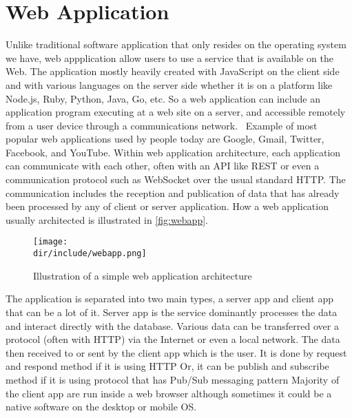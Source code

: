 \section{Web Application}
\label{sec:webapp}

Unlike traditional software application that only resides on the operating system we have, web appplication allow users to use a service that is available on the Web.
The application mostly heavily created with JavaScript on the client side and with various languages on the server side whether it is on a platform like Node.js, Ruby, Python, Java, Go, etc.
So a web application can include an application program executing at a web site on a server, and accessible remotely from a user device through a communications network.~\autocite{Addala:2013:InteractiveWebAppFramework}
Example of most popular web applications used by people today are Google, Gmail, Twitter, Facebook, and YouTube.
Within web application architecture, each application can communicate with each other, often with an \ac{API} like \ac{REST} or even a communication protocol such as WebSocket over the usual standard \ac{HTTP}.
The communication includes the reception and publication of data that has already been processed by any of client or server application.
How a web application usually architected is illustrated in \autoref{fig:webapp}.

\begin{figure}[htbp]
    \centering
    \texttt{[image: \\dir/include/webapp.png]}
    \caption[Web Application Architecture]{Illustration of a simple web application architecture}
    \label{fig:webapp}
\end{figure}

The application is separated into two main types, a server app and client app that can be a lot of it.
Server app is the service dominantly processes the data and interact directly with the database.
Various data can be transferred over a protocol (often with \ac{HTTP}) via the Internet or even a local network.
The data then received to or sent by the client app which is the user.
It is done by request and respond method if it is using \ac{HTTP}
Or, it can be publish and subscribe method if it is using protocol that has \ac{Pub/Sub} messaging pattern
Majority of the client app are run inside a web browser although sometimes it could be a native software on the desktop or mobile \ac{OS}.
